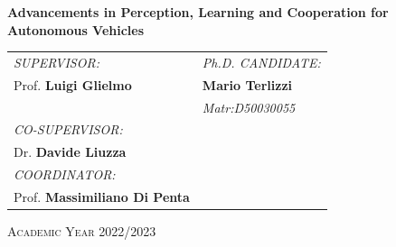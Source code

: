 \vspace{0.25cm}

%
%
\begin{center}
	{\LARGE \textbf{Advancements in Perception, Learning and Cooperation for Autonomous Vehicles }   }                                         
\end{center}

\vspace{2cm}
   \begin{tabular}{ll}
			\textit{SUPERVISOR:}        \hspace{3cm}   	& \textit{Ph.D. CANDIDATE:}\\
               Prof. \textbf{Luigi Glielmo 
               }      \hspace{5cm}     & \textbf{Mario Terlizzi}\\   
            \hspace{2cm}      & \textit{Matr:D50030055	}\\        
                    \textit{CO-SUPERVISOR:}           \\  \vspace{0.5cm}      Dr. \textbf{Davide Liuzza
                    }        	\\ \textit{COORDINATOR:}           \\        Prof. \textbf{Massimiliano Di Penta
                    }   				   
%                        
     \end{tabular}

\vspace{2cm}
    \begin{center}
         \textsc{Academic Year 2022/2023}
    \end{center}
    
\newpage












